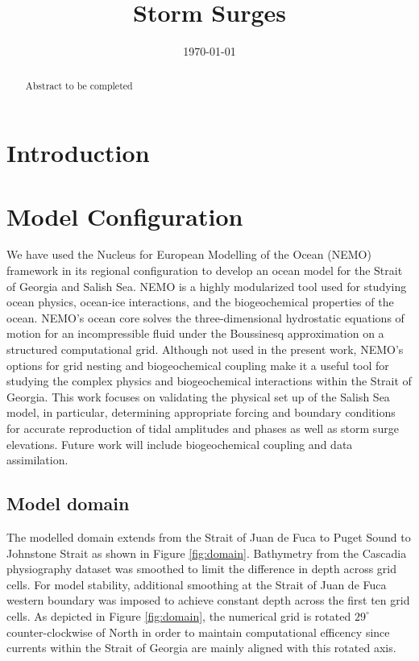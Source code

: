 \documentclass[pdftex,10pt]{article}
\title{Storm Surges}
\date{\today}
\begin{document}
\maketitle

\begin{abstract}
Abstract to be completed
\end{abstract}

\section{Introduction}\label{sec:intro}
\citep{masson2004modelling} %

\section{Model Configuration}\label{sec:config}
We have used the Nucleus for European Modelling of the Ocean (NEMO) framework in its regional configuration to develop an ocean model for the Strait of Georgia and Salish Sea. NEMO is a highly modularized tool used for studying ocean physics, ocean-ice interactions, and the biogeochemical properties of the ocean. NEMO's ocean core solves the three-dimensional hydrostatic equations of motion for an incompressible fluid under the Boussinesq approximation on a structured computational grid. Although not used in the present work, NEMO's options for grid nesting and biogeochemical coupling make it a useful tool for studying the complex physics and biogeochemical interactions within the Strait of Georgia. This work focuses on validating the physical set up of the Salish Sea model, in particular, determining appropriate forcing and boundary conditions for accurate reproduction of tidal amplitudes and phases as well as storm surge elevations. Future work will include biogeochemical coupling and data assimilation. 

\subsection{Model domain}
The modelled domain extends from the Strait of Juan de Fuca to Puget Sound to Johnstone Strait as shown in Figure \ref{fig:domain}. Bathymetry from the Cascadia physiography dataset \citep{haugerud1999digital} was smoothed to limit the difference in depth across grid cells. For model stability, additional smoothing at the Strait of Juan de Fuca western boundary was imposed to achieve constant depth across the first ten grid cells. As depicted in Figure \ref{fig:domain}, the numerical grid is rotated $29^{\circ}$ counter-clockwise of North in order to maintain computational efficency since currents within the Strait of Georgia are mainly aligned with this rotated axis. 
\end{document}
